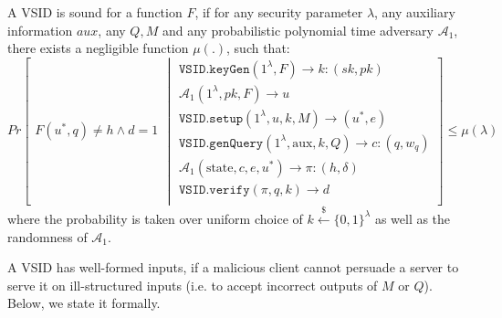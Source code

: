 \begin{definition}\label{deff::VSID-Soundness}  A VSID  is sound for a function $F$, if for any security parameter $\lambda$, any auxiliary information $aux$, any $Q,M$ and any probabilistic polynomial time adversary $\mathcal{A}_{\scriptscriptstyle 1}$, there exists a negligible function $\mu(.)$, such that: 
\small{
$$ Pr\left[
  \begin{array}{l}
F(u^{\scriptscriptstyle *},q)\neq h \wedge d=1
\end{array} \middle |
    \begin{array}{l}
    \mathtt{VSID.keyGen}(1^{\lambda},F)\rightarrow k:(sk,pk)\\
    \mathcal{A}_{\scriptscriptstyle 1}(1^{\scriptscriptstyle\lambda},pk, F)\rightarrow u\\
    \mathtt{VSID.setup}(1^{\lambda}, u,k,M)\rightarrow (u^{\scriptscriptstyle *},e)\\
    \mathtt{VSID.genQuery}(1^{\lambda},  \text{aux},k,Q)\rightarrow c:(q,w_{q})\\
     \mathcal{A}_{\scriptscriptstyle 1}(\text{state},c,e, u^{\scriptscriptstyle *})\rightarrow \pi:(h,\delta)\\
     \mathtt{VSID.verify}(\pi,q,k)\rightarrow d\\
\end{array}    \right]\leq \mu(\lambda)$$
}
where the probability is taken over uniform  choice of $k\stackrel{\scriptscriptstyle\$}\leftarrow \{0,1\}^{\scriptscriptstyle\lambda}$ as well as the randomness of $\mathcal{A}_{\scriptscriptstyle 1}$.
\end{definition}


A VSID has   well-formed inputs, if a malicious client cannot persuade a server to serve it on  ill-structured inputs (i.e. to accept  incorrect outputs of $M$ or $Q$). Below, we state it  formally.


